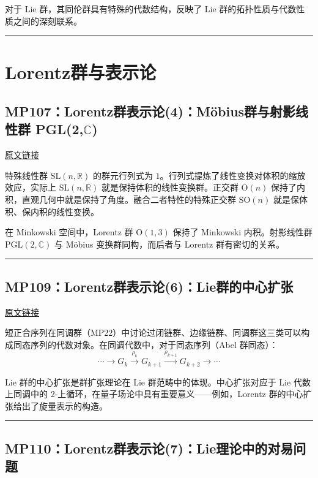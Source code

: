 \documentclass[10pt, openany]{book}
\begin{document}
对于 Lie 群，其同伦群具有特殊的代数结构，反映了 Lie 群的拓扑性质与代数性质之间的深刻联系。

\medskip
\noindent\rule{\textwidth}{0.4pt}

\chapter{Lorentz群与表示论}

\section{MP107：Lorentz群表示论(4)：M\"{o}bius群与射影线性群 PGL(2,$\mathbb{C}$)}
\label{sec:mp107}

\href{https://zhuanlan.zhihu.com/p/51636554}{原文链接}

特殊线性群 $\text{SL}(n,\mathbb{R})$ 的群元行列式为 $1$。行列式提炼了线性变换对体积的缩放效应，实际上 $\text{SL}(n,\mathbb{R})$ 就是保持体积的线性变换群。正交群 $\text{O}(n)$ 保持了内积，直观几何中就是保持了角度。融合二者特性的特殊正交群 $\text{SO}(n)$ 就是保体积、保内积的线性变换。

在 Minkowski 空间中，Lorentz 群 $\text{O}(1,3)$ 保持了 Minkowski 内积。射影线性群 $\text{PGL}(2,\mathbb{C})$ 与 M\"{o}bius 变换群同构，而后者与 Lorentz 群有密切的关系。

\medskip
\noindent\rule{\textwidth}{0.4pt}

\section{MP109：Lorentz群表示论(6)：Lie群的中心扩张}
\label{sec:mp109}

\href{https://zhuanlan.zhihu.com/p/57871599}{原文链接}

短正合序列在同调群（MP22）中讨论过闭链群、边缘链群、同调群这三类可以构成同态序列的代数对象。在同调代数中，对于同态序列（Abel 群同态）：
\[
\cdots \to G_k \xrightarrow{\rho_k} G_{k+1} \xrightarrow{\rho_{k+1}} G_{k+2} \to \cdots
\]

Lie 群的中心扩张是群扩张理论在 Lie 群范畴中的体现。中心扩张对应于 Lie 代数上同调中的 2-上循环，在量子场论中具有重要意义——例如，Lorentz 群的中心扩张给出了旋量表示的构造。

\medskip
\noindent\rule{\textwidth}{0.4pt}

\section{MP110：Lorentz群表示论(7)：Lie理论中的对易问题}
\label{sec:mp110}
\end{document}
